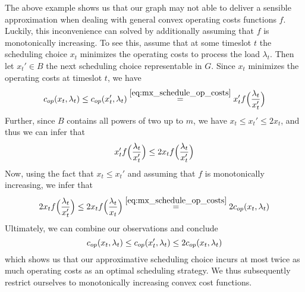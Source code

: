 The above example shows us that our graph may not able to deliver a sensible approximation when dealing with general convex operating costs functions $f$. Luckily, this inconvenience can solved by additionally assuming that $f$ is monotonically increasing. To see this, assume that at some timeslot $t$ the scheduling choice $x_t$ minimizes the operating costs to process the load $\lambda_t$. Then let $x_t'\in B$ the next scheduling choice representable in $G$. Since $x_t$ minimizes the operating costs at timeslot $t$, we have
\begin{equation*}
	c_{op}(x_t,\lambda_t)\le c_{op}(x_t',\lambda_t)\stackrel{\eqref{eq:mx_schedule_op_costs}}{=}x_t'f\Bigl(\frac{\lambda_t}{x_t'}\Bigr)
\end{equation*}
Further, since $B$ contains all powers of two up to $m$, we have $x_t\le x_t'\le 2x_t$, and thus we can infer that
\begin{equation*}
	x_t'f\Bigl(\frac{\lambda_t}{x_t'}\Bigr)\le2x_tf\Bigl(\frac{\lambda_t}{x_t'}\Bigr)
\end{equation*}
Now, using the fact that $x_t\le x_t'$ and assuming that $f$ is monotonically increasing, we infer that
\begin{equation*}
	2x_tf\Bigl(\frac{\lambda_t}{x_t'}\Bigr)\le 2x_tf\Bigl(\frac{\lambda_t}{x_t}\Bigr)\stackrel{\eqref{eq:mx_schedule_op_costs}}{=}2c_{op}(x_t,\lambda_t)
\end{equation*}
Ultimately, we can combine our observations and conclude
\begin{equation*}
	c_{op}(x_t,\lambda_t)\le c_{op}(x_t',\lambda_t)\le2c_{op}(x_t,\lambda_t)
\end{equation*}
which shows us that our approximative scheduling choice incurs at most twice as much operating costs as an optimal scheduling strategy. We thus subsequently restrict ourselves to monotonically increasing convex cost functions.

